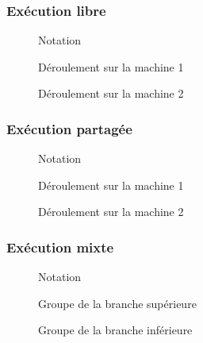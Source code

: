 \documentclass[handout]{beamer}
\begin{document}
\begin{frame}
\frametitle{Exécution libre}
\begin{figure}
    \centering
    \begin{tikzpicture}
    
    \end{tikzpicture}
    \caption{Notation}
\end{figure}
\begin{figure}
    \centering
    \begin{tikzpicture}
    
    \end{tikzpicture}
    \caption{Déroulement sur la machine 1}
\end{figure}
\begin{figure}
    \centering
    \begin{tikzpicture}
    
    \end{tikzpicture}
    \caption{Déroulement sur la machine 2}
\end{figure}
\end{frame}
\begin{frame}
\frametitle{Exécution partagée}
\begin{figure}
    \centering
    \begin{tikzpicture}
    
    \end{tikzpicture}
    \caption{Notation}
\end{figure}
\begin{figure}
    \centering
    \begin{tikzpicture}
    
    \end{tikzpicture}
    \caption{Déroulement sur la machine 1}
\end{figure}
\begin{figure}
    \centering
    \begin{tikzpicture}
    
    \end{tikzpicture}
    \caption{Déroulement sur la machine 2}
\end{figure}
\end{frame}
\begin{frame}
\frametitle{Exécution mixte}

\begin{figure}
    \centering
    \begin{tikzpicture}
    
    \end{tikzpicture}
    \caption{Notation}
\end{figure}
\begin{figure}
\centering
\begin{tikzpicture}

\end{tikzpicture}
\caption{Groupe de la branche supérieure}
\end{figure}
\begin{figure}
\centering
\begin{tikzpicture}

\end{tikzpicture}
\caption{Groupe de la branche inférieure}
\end{figure}
\end{frame}
\end{document}
